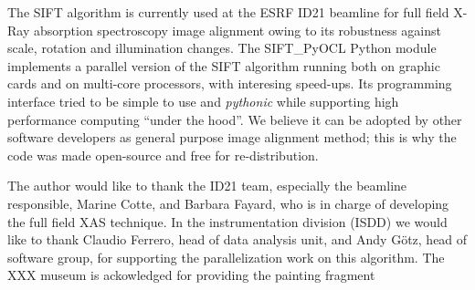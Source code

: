 \documentclass[preprint]{iucr}
\begin{document}
The SIFT algorithm is currently used at the ESRF ID21 beamline for full field
X-Ray absorption spectroscopy image alignment owing to its robustness against
scale, rotation and illumination changes.
The SIFT\_PyOCL Python module implements a parallel version of the SIFT
algorithm running both on graphic cards and on multi-core processors, with
interesing speed-ups.
Its programming interface tried to be simple to use and \emph{pythonic} while
supporting high performance computing ``under the hood''.
We believe it can be adopted by other software developers as general purpose
image alignment method; this is why the code was made open-source and free for
re-distribution.



The author would like to thank the ID21 team, especially the beamline
responsible, Marine Cotte, and Barbara Fayard, who is in charge of developing
the full field XAS technique.
In the instrumentation division (ISDD) we would like to thank Claudio Ferrero,
head of data analysis unit, and Andy G\"otz, head of software group, for
supporting the parallelization work on this algorithm.
The XXX museum is ackowledged for providing the painting fragment


\end{document}
